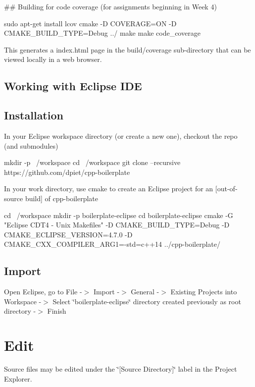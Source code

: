 \#\# Building for code coverage (for assignments beginning in Week 4) 
\begin{DoxyCode}
sudo apt-get install lcov
cmake -D COVERAGE=ON -D CMAKE\_BUILD\_TYPE=Debug ../
make
make code\_coverage
\end{DoxyCode}
 This generates a index.\+html page in the build/coverage sub-\/directory that can be viewed locally in a web browser.

\subsection*{Working with Eclipse I\+DE}

\subsection*{Installation}

In your Eclipse workspace directory (or create a new one), checkout the repo (and submodules) 
\begin{DoxyCode}
mkdir -p ~/workspace
cd ~/workspace
git clone --recursive https://github.com/dpiet/cpp-boilerplate
\end{DoxyCode}


In your work directory, use cmake to create an Eclipse project for an \mbox{[}out-\/of-\/source build\mbox{]} of cpp-\/boilerplate


\begin{DoxyCode}
cd ~/workspace
mkdir -p boilerplate-eclipse
cd boilerplate-eclipse
cmake -G "Eclipse CDT4 - Unix Makefiles" -D CMAKE\_BUILD\_TYPE=Debug -D CMAKE\_ECLIPSE\_VERSION=4.7.0 -D
       CMAKE\_CXX\_COMPILER\_ARG1=-std=c++14 ../cpp-boilerplate/
\end{DoxyCode}


\subsection*{Import}

Open Eclipse, go to File -\/$>$ Import -\/$>$ General -\/$>$ Existing Projects into Workspace -\/$>$ Select \char`\"{}boilerplate-\/eclipse\char`\"{} directory created previously as root directory -\/$>$ Finish

\section*{Edit}

Source files may be edited under the \char`\"{}\mbox{[}\+Source Directory\mbox{]}\char`\"{} label in the Project Explorer.


